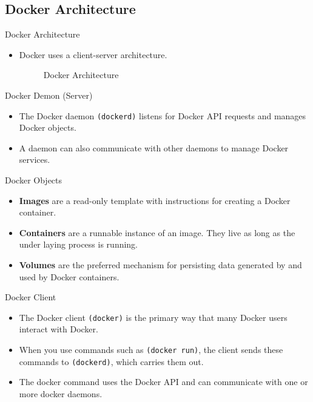 \subsection{Docker Architecture}\label{subsec:docker-architecture}
\begin{frame}{Docker Architecture}
    \begin{itemize}
        \item Docker uses a client-server architecture.
        \linebreak
        \pause
        \begin{figure}[!t]
            \raggedright
            
            \caption{Docker Architecture}
        \end{figure}
    \end{itemize}
\end{frame}
\begin{frame}{Docker Demon (Server)}
    \begin{itemize}[<+- | alert@+>]
        \item The Docker daemon \texttt{(dockerd)} listens for Docker API requests and manages Docker objects.
        \item A daemon can also communicate with other daemons to manage Docker services.

    \end{itemize}
\end{frame}
\begin{frame}{Docker Objects}
    \begin{itemize}[<+- | alert@+>]
        \item \textbf{Images} are a read-only template with instructions for creating a Docker container.
        \item \textbf{Containers} are a runnable instance of an image.
        They live as long as the under laying process is running.
        \item \textbf{Volumes} are the preferred mechanism for persisting data generated by and used by Docker containers.
    \end{itemize}
\end{frame}
\begin{frame}{Docker Client}
    \begin{itemize}[<+- | alert@+>]
        \item The Docker client \texttt{(docker)} is the primary way that many Docker users interact with Docker.
        \item When you use commands such as \texttt{(docker run)}, the client sends these commands to \texttt{(dockerd)}, which carries them out.
        \item The docker command uses the Docker API and can communicate with one or more docker daemons.
    \end{itemize}
\end{frame}
